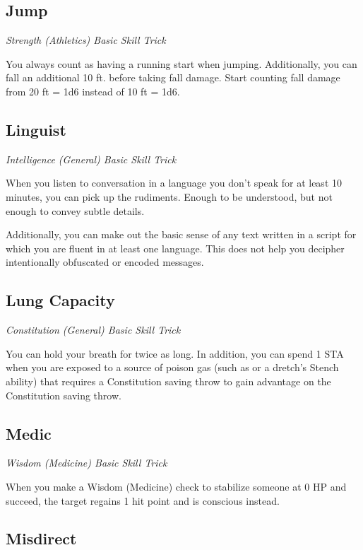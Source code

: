 \subsection{Jump}

\textit{Strength (Athletics) Basic Skill Trick}

You always count as having a running start when jumping. Additionally, you can fall an additional 10 ft. before taking fall damage. Start counting fall damage from 20 ft = 1d6 instead of 10 ft = 1d6.

\subsection{Linguist}\label{st:linguist}

\textit{Intelligence (General) Basic Skill Trick}

When you listen to conversation in a language you don't speak for at least 10 minutes, you can pick up the rudiments. Enough to be understood, but not enough to convey subtle details.

Additionally, you can make out the basic sense of any text written in a script for which you are fluent in at least one language. This does not help you decipher intentionally obfuscated or encoded messages.

\subsection{Lung Capacity}\label{st:lung-capacity}

\textit{Constitution (General) Basic Skill Trick}

You can hold your breath for twice as long. In addition, you can spend 1 STA when you are exposed to a source of poison gas (such as  or a dretch's Stench ability) that requires a Constitution saving throw to gain advantage on the Constitution saving throw. 

\subsection{Medic}\label{st:medic}

\textit{Wisdom (Medicine) Basic Skill Trick}

When you make a Wisdom (Medicine) check to stabilize someone at 0 HP and succeed, the target regains 1 hit point and is conscious instead.

\subsection{Misdirect}\label{st:misdirect}

